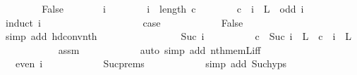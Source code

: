 \begin{isabellebody}
\ \ \isamarkupfalse%
\isanewline
\ \ \ \ \isamarkupfalse%
\ False\isanewline
\ \ \ \ \isacommand{{\isacharbraceleft}{\kern0pt}}\isamarkupfalse%
\ \isamarkupfalse%
\ i\isanewline
\ \ \ \ \ \ \isamarkupfalse%
\ {\isachardoublequoteopen}i\ {\isacharless}{\kern0pt}\ length\ c{\isachardoublequoteclose}\isanewline
\ \ \ \ \ \ \isamarkupfalse%
\ {\isachardoublequoteopen}c\ {\isacharbang}{\kern0pt}\ i\ {\isasymin}\ L\ {\isasymlongleftrightarrow}\ odd\ i{\isachardoublequoteclose}\isanewline
\ \ \ \ \ \ \isamarkupfalse%
\ {\isacharparenleft}{\kern0pt}induct\ i{\isacharparenright}{\kern0pt}\isanewline
\ \ \ \ \ \ \ \ \isamarkupfalse%
\ {}\isanewline
\ \ \ \ \ \ \ \ \isamarkupfalse%
\ {\isacharquery}{\kern0pt}case\isanewline
\ \ \ \ \ \ \ \ \ \ \isamarkupfalse%
\ False\isanewline
\ \ \ \ \ \ \ \ \ \ \isamarkupfalse%
\ {\isacharparenleft}{\kern0pt}simp\ add{\isacharcolon}{\kern0pt}\ hd{\isacharunderscore}{\kern0pt}conv{\isacharunderscore}{\kern0pt}nth{\isacharparenright}{\kern0pt}\isanewline
\ \ \ \ \ \ \isamarkupfalse%
\isanewline
\ \ \ \ \ \ \ \ \isamarkupfalse%
\ {\isacharparenleft}{\kern0pt}Suc\ i{\isacharparenright}{\kern0pt}\isanewline
\ \ \ \ \ \ \ \ \isamarkupfalse%
\ {\isachardoublequoteopen}c\ {\isacharbang}{\kern0pt}\ Suc\ i\ {\isasymin}\ L\ {\isasymlongleftrightarrow}\ c\ {\isacharbang}{\kern0pt}\ i\ {\isasymnotin}\ L{\isachardoublequoteclose}\isanewline
\ \ \ \ \ \ \ \ \ \ \isamarkupfalse%
\ assm\isanewline
\ \ \ \ \ \ \ \ \ \ \isamarkupfalse%
\ {\isacharparenleft}{\kern0pt}auto\ simp\ add{\isacharcolon}{\kern0pt}\ nth{\isacharunderscore}{\kern0pt}mem{\isacharunderscore}{\kern0pt}L{\isacharunderscore}{\kern0pt}iff{\isacharunderscore}{\kern0pt}{}{\isacharparenright}{\kern0pt}\isanewline
\ \ \ \ \ \ \ \ \isamarkupfalse%
\ \isamarkupfalse%
\ {\isachardoublequoteopen}{\isachardot}{\kern0pt}{\isachardot}{\kern0pt}{\isachardot}{\kern0pt}\ {\isasymlongleftrightarrow}\ even\ i{\isachardoublequoteclose}\isanewline
\ \ \ \ \ \ \ \ \ \ \isamarkupfalse%
\ Suc{\isachardot}{\kern0pt}prems\isanewline
\ \ \ \ \ \ \ \ \ \ \isamarkupfalse%
\ {\isacharparenleft}{\kern0pt}simp\ add{\isacharcolon}{\kern0pt}\ Suc{\isachardot}{\kern0pt}hyps{\isacharparenright}{\kern0pt}\isanewline
\ \ \ \ \ \ \ \ \isamarkupfalse%
\ \isamarkupfalse%

\end{isabellebody}
